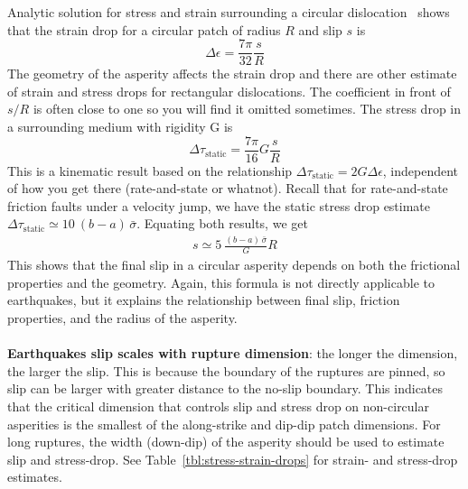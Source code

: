 \documentclass[letterpaper,12pt,]{memoir}
\begin{document}
Analytic solution for stress and strain surrounding a circular dislocation~\citep{eshelby57} shows that the strain drop for a circular patch of radius $R$ and slip $s$ is
\begin{equation}
\Delta\epsilon=\frac{7\pi}{32}\frac{s}{R}
\end{equation}
The geometry of the asperity affects the strain drop and there are other estimate of strain and stress drops for rectangular dislocations. The coefficient in front of $s/R$ is often close to one so you will find it omitted sometimes. The stress drop in a surrounding medium with rigidity G is
\begin{equation}
\Delta\tau_\text{static}=\frac{7\pi}{16}G\frac{s}{R}
\end{equation}
This is a kinematic result based on the relationship $\Delta\tau_\text{static}=2G\Delta\epsilon$, independent of how you get there (rate-and-state or whatnot). Recall that for rate-and-state friction faults under a velocity jump, we have the static stress drop estimate $\Delta\tau_\text{static}\simeq 10~(b-a)\,\bar{\sigma}$. Equating both results, we get
\begin{equation}\label{eqn:slip}
\boxed{\begin{aligned}
s\simeq 5~\frac{(b-a)\,\bar{\sigma}}{G}R
\end{aligned}}
\end{equation}
This shows that the final slip in a circular asperity depends on both the frictional properties and the geometry. Again, this formula is not directly applicable to earthquakes, but it explains the relationship between final slip, friction properties, and the radius of the asperity. \\
\\
\textbf{Earthquakes slip scales with rupture dimension}: the longer the dimension, the larger the slip. This is because the boundary of the ruptures are pinned, so slip can be larger with greater distance to the no-slip boundary. This indicates that the critical dimension that controls slip and stress drop on non-circular asperities is the smallest of the along-strike and dip-dip patch dimensions. For long ruptures, the width (down-dip) of the asperity should be used to estimate slip and stress-drop. See Table~\ref{tbl:stress-strain-drops} for strain- and stress-drop estimates.

\end{document}

